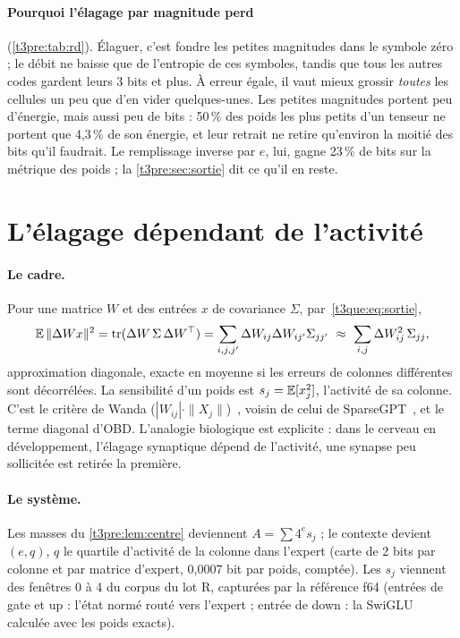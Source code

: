 \paragraph{Pourquoi l'élagage par magnitude perd} (\cref{t3pre:tab:rd}). Élaguer, c'est fondre les petites magnitudes dans le symbole zéro ; le débit ne baisse que de l'entropie de ces symboles, tandis que tous les autres codes gardent leurs 3 bits et plus. À erreur égale, il vaut mieux grossir \emph{toutes} les cellules un peu que d'en vider quelques-unes. Les petites magnitudes portent peu d'énergie, mais aussi peu de bits : 50\,\% des poids les plus petits d'un tenseur ne portent que 4,3\,\% de son énergie, et leur retrait ne retire qu'environ la moitié des bits qu'il faudrait. Le remplissage inverse par $e$, lui, gagne 23\,\% de bits sur la métrique des poids ; la \cref{t3pre:sec:sortie} dit ce qu'il en reste.

\section{L'élagage dépendant de l'activité}\label{t3pre:sec:activite}

\paragraph{Le cadre.} Pour une matrice $W$ et des entrées $x$ de covariance $\Sigma$, par~\eqref{t3que:eq:sortie},
\begin{equation}\label{t3pre:eq:diag}
\E\,\|\Delta W x\|^2 = \mathrm{tr}(\Delta W\, \Sigma\, \Delta W^\top) = \sum_{i,j,j'} \Delta W_{ij}\Delta W_{ij'}\Sigma_{jj'} \ \approx\ \sum_{i,j} \Delta W_{ij}^2\, \Sigma_{jj},
\end{equation}
approximation diagonale, exacte en moyenne si les erreurs de colonnes différentes sont décorrélées. La sensibilité d'un poids est $s_j = \mathbb{E}[x_j^2]$, l'activité de sa colonne. C'est le critère de Wanda ($|W_{ij}|\cdot\|X_j\|$)~\cite{genome-pe-sun2023wanda}, voisin de celui de SparseGPT~\cite{genome-pe-frantar2023sparsegpt}, et le terme diagonal d'OBD. L'analogie biologique est explicite : dans le cerveau en développement, l'élagage synaptique dépend de l'activité, une synapse peu sollicitée est retirée la première.

\paragraph{Le système.} Les masses du \cref{t3pre:lem:centre} deviennent $A = \sum 4^{e} s_j$ ; le contexte devient $(e, q)$, $q$ le quartile d'activité de la colonne dans l'expert (carte de 2 bits par colonne et par matrice d'expert, 0,0007 bit par poids, comptée). Les $s_j$ viennent des fenêtres 0 à 4 du corpus du lot R, capturées par la référence f64 (entrées de gate et up : l'état normé routé vers l'expert ; entrée de down : la SwiGLU calculée avec les poids exacts).

